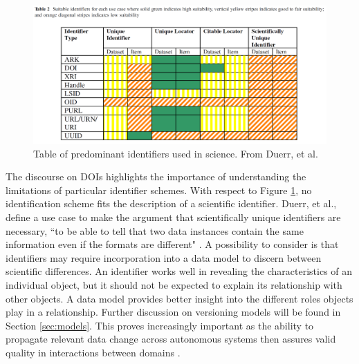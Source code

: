 \begin{figure}
	\centering
	\includegraphics[scale=0.30]{figures/DigitalIdentifierTable.png}
	\caption[Table of predominant identifiers used in science.]{Table of predominant identifiers used in science.  From Duerr, et al. \cite{Duerr2011}}
	\label{table:Duerr}
\end{figure}

The discourse on DOIs highlights the importance of understanding the limitations of particular identifier schemes.
With respect to Figure \ref{table:Duerr}, no identification scheme fits the description of a scientific identifier.
Duerr, et al., define a use case to make the argument that scientifically unique identifiers are necessary, ``to be able to tell that two data instances contain the same information even if the formats are different" \cite{Duerr2011}.
A possibility to consider is that identifiers may require incorporation into a data model to discern between scientific differences.
An identifier works well in revealing the characteristics of an individual object, but it should not be expected to explain its relationship with other objects.
A data model provides better insight into the different roles objects play in a relationship.
Further discussion on versioning models will be found in Section \ref{sec:models}.
This proves increasingly important as the ability to propagate relevant data change across autonomous systems then assures valid quality in interactions between domains \cite{Systems02champagne:data}.

